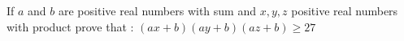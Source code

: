 If $a$ and $b$ are positive real numbers with sum  and $x, y, z$ positive real numbers with product  prove that :
$(ax+b)(ay+b)(az+b)\geq 27$